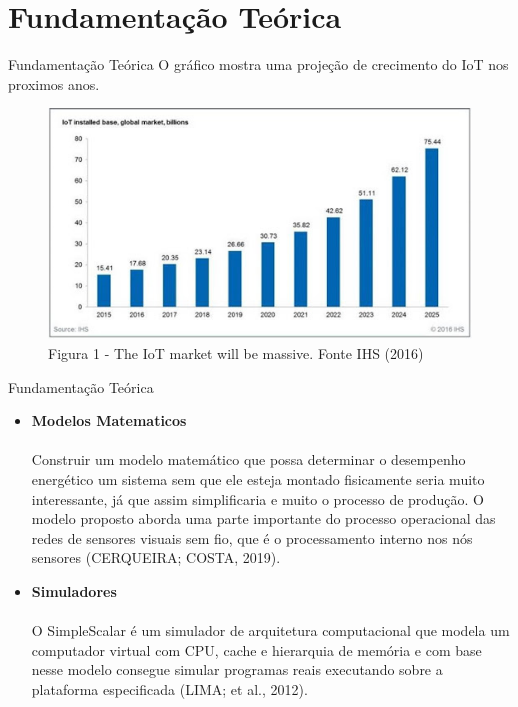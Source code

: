 \documentclass{IFES-beamer}
\begin{document}
\section{Fundamentação Teórica}
\begin{frame}{Fundamentação Teórica}
O gráfico mostra uma projeção de crecimento do IoT nos proximos anos.

\begin{figure}
\centering
\includegraphics[width=\linewidth]{images/grafico.jpg}
\caption{ Figura 1 - The IoT market will be massive. Fonte IHS (2016) }
\end{figure}

\end{frame}

\begin{frame}{Fundamentação Teórica}
\begin{itemize}
    \item \textbf{ Modelos Matematicos }\\ \\Construir um modelo matemático que possa determinar o desempenho energético um sistema sem que ele esteja montado fisicamente seria muito interessante, já que assim simplificaria e muito o processo de produção. O modelo proposto aborda uma parte importante do processo operacional das redes de sensores visuais sem fio, que é o processamento interno nos nós sensores (CERQUEIRA; COSTA, 2019).
    \item \textbf{Simuladores}\\ \\O SimpleScalar é um simulador de arquitetura computacional que modela um computador virtual com CPU, cache e hierarquia de memória e com base nesse modelo consegue simular programas reais executando sobre a plataforma especificada (LIMA; et al., 2012).
    
\end{itemize}
    \end{frame}
\end{document}
